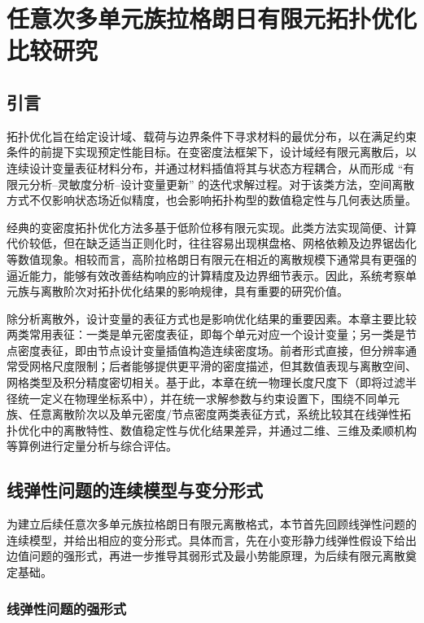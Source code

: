 \chapter{任意次多单元族拉格朗日有限元拓扑优化比较研究}
\label{chap:lagrange_comparison}


\section{引言}
\label{sec:ch3_intro}

拓扑优化旨在给定设计域、载荷与边界条件下寻求材料的最优分布，以在满足约束条件的前提下实现预定性能目标。在变密度法框架下，设计域经有限元离散后，以连续设计变量表征材料分布，并通过材料插值将其与状态方程耦合，从而形成 “有限元分析--灵敏度分析--设计变量更新” 的迭代求解过程。对于该类方法，空间离散方式不仅影响状态场近似精度，也会影响拓扑构型的数值稳定性与几何表达质量。

经典的变密度拓扑优化方法多基于低阶位移有限元实现。此类方法实现简便、计算代价较低，但在缺乏适当正则化时，往往容易出现棋盘格、网格依赖及边界锯齿化等数值现象。相较而言，高阶拉格朗日有限元在相近的离散规模下通常具有更强的逼近能力，能够有效改善结构响应的计算精度及边界细节表示。因此，系统考察单元族与离散阶次对拓扑优化结果的影响规律，具有重要的研究价值。

除分析离散外，设计变量的表征方式也是影响优化结果的重要因素。本章主要比较两类常用表征：一类是单元密度表征，即每个单元对应一个设计变量；另一类是节点密度表征，即由节点设计变量插值构造连续密度场。前者形式直接，但分辨率通常受网格尺度限制；后者能够提供更平滑的密度描述，但其数值表现与离散空间、网格类型及积分精度密切相关。基于此，本章在统一物理长度尺度下（即将过滤半径统一定义在物理坐标系中），并在统一求解参数与约束设置下，围绕不同单元族、任意离散阶次以及单元密度/节点密度两类表征方式，系统比较其在线弹性拓扑优化中的离散特性、数值稳定性与优化结果差异，并通过二维、三维及柔顺机构等算例进行定量分析与综合评估。


\section{线弹性问题的连续模型与变分形式}
\label{sec:linear_elastic}

为建立后续任意次多单元族拉格朗日有限元离散格式，本节首先回顾线弹性问题的连续模型，并给出相应的变分形式。具体而言，先在小变形静力线弹性假设下给出边值问题的强形式，再进一步推导其弱形式及最小势能原理，为后续有限元离散奠定基础。


\subsection{线弹性问题的强形式}
\label{subsec:elastic_strong}

